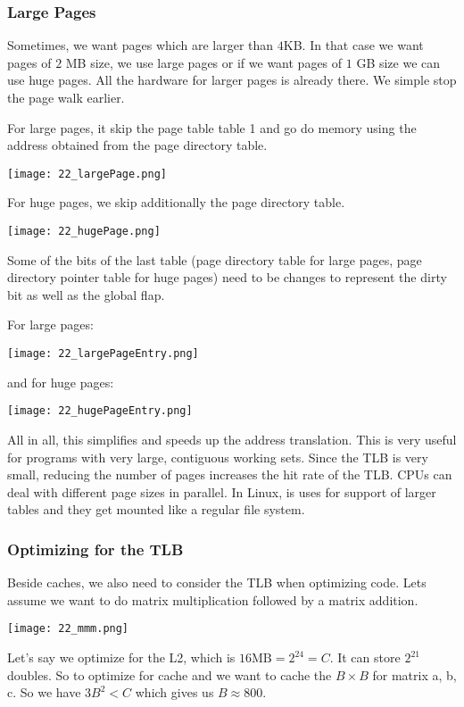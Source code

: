 

\subsubsection{Large Pages}
Sometimes, we want pages which are larger than $4$KB. In that case we want pages of $2$ MB size, we use large pages or if we want pages of $1$ GB size we can use huge pages. All the hardware for larger pages is already there. We simple stop the page walk earlier.

For large pages, it skip the page table table 1 and go do memory using the address obtained from the page directory table.

\texttt{[image: 22\_largePage.png]}

For huge pages, we skip additionally the page directory table.

\texttt{[image: 22\_hugePage.png]}

Some of the bits of the last table (page directory table for large pages, page directory pointer table for huge pages) need to be changes to represent the dirty bit as well as the global flap.

For large pages:

\texttt{[image: 22\_largePageEntry.png]}

and for huge pages:

\texttt{[image: 22\_hugePageEntry.png]}

All in all, this simplifies and speeds up the address translation. This is very useful for programs with very large, contiguous working sets. Since the TLB is very small, reducing the number of pages increases the hit rate of the TLB. CPUs can deal with different page sizes in parallel. In Linux,  is uses for support of larger tables and they get mounted like a regular file system.

\subsubsection{Optimizing for the TLB}
Beside caches, we also need to consider the TLB when optimizing code. Lets assume we want to do matrix multiplication followed by a matrix addition.

\texttt{[image: 22\_mmm.png]}

Let's say we optimize for the L2, which is $16 \text{MB} = 2^{24} = C$. It can store $2^{21}$ doubles. So to optimize for cache and we want to cache the $B \times B$ for matrix a, b, c. So we have $3B^2 < C$ which gives us $B \approx 800$.

